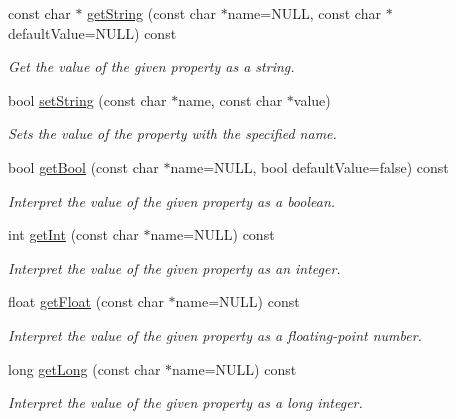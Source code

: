 \begin{DoxyCompactItemize}
const char $\ast$ \hyperlink{class_i_dream_sky_1_1_key_value_pairs_a93d003ece662c4f4cb231d855f64e20d}{get\+String} (const char $\ast$name=N\+U\+LL, const char $\ast$default\+Value=N\+U\+LL) const 
\begin{DoxyCompactList}\small\item\em Get the value of the given property as a string. \end{DoxyCompactList}\item 
bool \hyperlink{class_i_dream_sky_1_1_key_value_pairs_aa28812b5b1ec5199b4bb856a8c2cb903}{set\+String} (const char $\ast$name, const char $\ast$value)
\begin{DoxyCompactList}\small\item\em Sets the value of the property with the specified name. \end{DoxyCompactList}\item 
bool \hyperlink{class_i_dream_sky_1_1_key_value_pairs_a37a28ad2cea38770b2dcd326ff104594}{get\+Bool} (const char $\ast$name=N\+U\+LL, bool default\+Value=false) const 
\begin{DoxyCompactList}\small\item\em Interpret the value of the given property as a boolean. \end{DoxyCompactList}\item 
int \hyperlink{class_i_dream_sky_1_1_key_value_pairs_adbd43ef0a19fbbbea5346ad21d110a75}{get\+Int} (const char $\ast$name=N\+U\+LL) const 
\begin{DoxyCompactList}\small\item\em Interpret the value of the given property as an integer. \end{DoxyCompactList}\item 
float \hyperlink{class_i_dream_sky_1_1_key_value_pairs_ac9afd08c687b02afd7d745d126528bd1}{get\+Float} (const char $\ast$name=N\+U\+LL) const 
\begin{DoxyCompactList}\small\item\em Interpret the value of the given property as a floating-\/point number. \end{DoxyCompactList}\item 
long \hyperlink{class_i_dream_sky_1_1_key_value_pairs_a998c2a98a559dbfe44d60970f5107e30}{get\+Long} (const char $\ast$name=N\+U\+LL) const 
\begin{DoxyCompactList}\small\item\em Interpret the value of the given property as a long integer. \end{DoxyCompactList}\item 

\end{DoxyCompactItemize}
